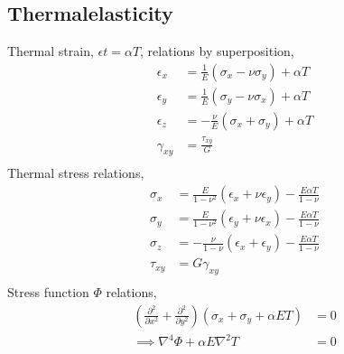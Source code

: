 \subsection*{Thermalelasticity}
Thermal strain, $\epsilon{t} = \alpha T$, relations by superposition,
\begin{align*}
    \epsilon_x &= \frac{1}{E} \left( \sigma_x - \nu \sigma_y \right) + \alpha T \\
    \epsilon_y &= \frac{1}{E} \left( \sigma_y - \nu \sigma_x \right) + \alpha T \\
    \epsilon_z &= -\frac{\nu}{E} \left( \sigma_x + \sigma_y \right) + \alpha T \\
    \gamma_{xy} &= \frac{\tau_{xy}}{G} \\
\end{align*}
Thermal stress relations,
\begin{align*}
    \sigma_x &= \frac{E}{1-\nu^2} \left( \epsilon_x + \nu \epsilon_y \right) - \frac{E\alpha T}{1-\nu} \\
    \sigma_y &= \frac{E}{1-\nu^2} \left( \epsilon_y + \nu \epsilon_x \right) - \frac{E\alpha T}{1-\nu} \\
    \sigma_z &= -\frac{\nu}{1-\nu} \left( \epsilon_x + \epsilon_y \right) - \frac{E\alpha T}{1-\nu} \\
    \tau_{xy} &= G \gamma_{xy} \\
\end{align*}
Stress function $\Phi$ relations,
\begin{align*}
    \left(\frac{\partial^2}{\partial x^2} + \frac{\partial^2}{\partial y^2} \right)(\sigma_x + \sigma_y + \alpha ET) &= 0 \\
    \implies \nabla^4 \Phi + \alpha E \nabla^2 T &= 0 \\
\end{align*}
